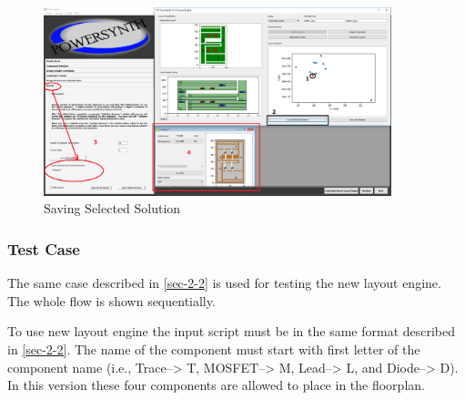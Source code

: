 \documentclass[11pt]{article}
\begin{document}
 \begin{figure}[H]
\centering
\includegraphics[width=0.9\textwidth, height=4 in]{./figs/Saving_sol.PNG}
\caption{Saving Selected Solution}
\label{save_sol}
\end{figure}

\subsubsection{Test Case}
\label{sec-2-6-7}
The same case described in \ref{sec-2-2} is used for testing the new layout engine. The whole flow is shown sequentially.

To use new layout engine the input script must be in the same format described in  \ref{sec-2-2}. The name of the component must start with first letter of the component name (i.e., Trace--> T, MOSFET--> M, Lead--> L, and Diode--> D). In this version these four components are allowed to place in the floorplan.
\end{document}
